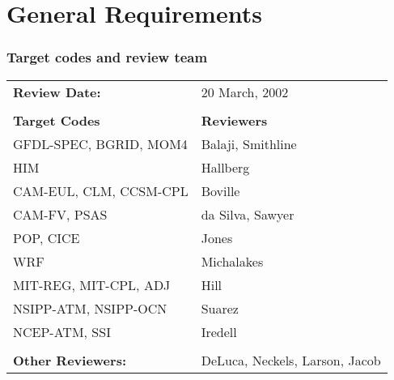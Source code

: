 \documentclass[english]{article}
\begin{document}




\newpage
\tableofcontents

\newpage
\begin{htmlonly}
\end{htmlonly}
\part{General Requirements}

\section{Target codes and review team}

\begin{tabular}{l l}

{\bf Review Date:}          & 20 March, 2002 \\ \\

{\bf Target Codes}            & {\bf Reviewers} \\
GFDL-SPEC, BGRID, MOM4        & Balaji, Smithline \\ 
HIM                           & Hallberg \\
CAM-EUL, CLM, CCSM-CPL        & Boville \\
CAM-FV, PSAS                  & da Silva, Sawyer\\
POP, CICE                     & Jones \\
WRF                           & Michalakes \\
MIT-REG, MIT-CPL, ADJ         & Hill \\
NSIPP-ATM, NSIPP-OCN          & Suarez \\
NCEP-ATM, SSI                 & Iredell \\ \\


{\bf Other Reviewers:}        & DeLuca, Neckels, Larson, Jacob

\end{tabular}

\end{document}
